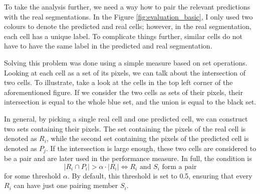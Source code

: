 \documentclass[
  digital,     %
  oneside,     %
  nosansbold,  %
  nocolorbold, %
  lof,         %
  lot,         %
]{fithesis4}
\begin{document}
To take the analysis further, we need a way how to pair the relevant predictions
with the real segmentations. In the Figure \ref{fig:evaluation_basic}, I only used two colours
to denote the predicted and real cells; however, in the real segmentation, each
cell has a unique label. To complicate things further, similar cells do not
have to have the same label in the predicted and real segmentation.

Solving this problem was done using a simple measure based on set operations.
Looking at each cell as a set of its pixels, we can talk about the intersection
of two cells. To illustrate, take a look at the cells in the top left corner of
the aforementioned figure. If we consider the two cells as sets of their
pixels, their intersection is equal to the whole blue set, and the union is
equal to the black set.

In general, by picking a single real cell and one predicted cell, we can construct
two sets containing their pixels. The set containing the pixels of the real cell is
denoted as $R_i$, while the second set containing the pixels of the predicted
cell is denoted as $P_j$. If the intersection is large enough, these two
cells are considered to be a pair and are later used in the performance measure. In full, the condition is
$$|R_i \cap P_i| > \alpha \cdot |R_i| \Leftrightarrow R_i \text{ and } S_i \text{ form a pair}$$
for some threshold $\alpha$. By default, this threshold is set to 0.5, ensuring
that every $R_i$ can have just one pairing member $S_i$.
\end{document}
